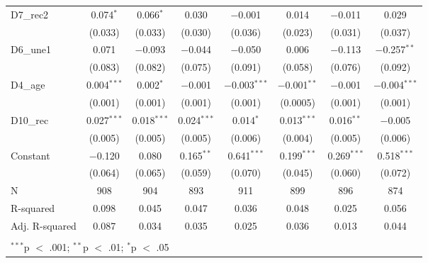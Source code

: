 \documentclass[
]{article}
\begin{document}
\begin{table}[!htbp]
\begin{tabular}{@{\extracolsep{5pt}}lccccccc}
  D7\_rec2 & 0.074$^{*}$ & 0.066$^{*}$ & 0.030 & $-$0.001 & 0.014 & $-$0.011 & 0.029 \\ 
  & (0.033) & (0.033) & (0.030) & (0.036) & (0.023) & (0.031) & (0.037) \\ 
  D6\_une1 & 0.071 & $-$0.093 & $-$0.044 & $-$0.050 & 0.006 & $-$0.113 & $-$0.257$^{**}$ \\ 
  & (0.083) & (0.082) & (0.075) & (0.091) & (0.058) & (0.076) & (0.092) \\ 
  D4\_age & 0.004$^{***}$ & 0.002$^{*}$ & $-$0.001 & $-$0.003$^{***}$ & $-$0.001$^{**}$ & $-$0.001 & $-$0.004$^{***}$ \\ 
  & (0.001) & (0.001) & (0.001) & (0.001) & (0.0005) & (0.001) & (0.001) \\ 
  D10\_rec & 0.027$^{***}$ & 0.018$^{***}$ & 0.024$^{***}$ & 0.014$^{*}$ & 0.013$^{***}$ & 0.016$^{**}$ & $-$0.005 \\ 
  & (0.005) & (0.005) & (0.005) & (0.006) & (0.004) & (0.005) & (0.006) \\ 
  Constant & $-$0.120 & 0.080 & 0.165$^{**}$ & 0.641$^{***}$ & 0.199$^{***}$ & 0.269$^{***}$ & 0.518$^{***}$ \\ 
  & (0.064) & (0.065) & (0.059) & (0.070) & (0.045) & (0.060) & (0.072) \\ 
 N & 908 & 904 & 893 & 911 & 899 & 896 & 874 \\ 
R-squared & 0.098 & 0.045 & 0.047 & 0.036 & 0.048 & 0.025 & 0.056 \\ 
Adj. R-squared & 0.087 & 0.034 & 0.035 & 0.025 & 0.036 & 0.013 & 0.044 \\ 
\hline \\[-1.8ex] 
\multicolumn{8}{l}{$^{***}$p $<$ .001; $^{**}$p $<$ .01; $^{*}$p $<$ .05} \\ 
\end{tabular} 
\end{table}
\end{document}
